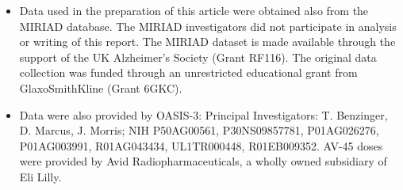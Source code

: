 \begin{itemize}
%
\item Data used in the preparation of this article were obtained also from the MIRIAD database.
The MIRIAD investigators did not participate in analysis or writing of this report.
The MIRIAD dataset is made available through the support of the UK Alzheimer's Society (Grant RF116).
The original data collection was funded through an unrestricted educational grant from GlaxoSmithKline (Grant 6GKC).
%
\item Data were also provided by OASIS-3:
Principal Investigators: T. Benzinger, D. Marcus, J. Morris; NIH P50AG00561, P30NS09857781, P01AG026276, P01AG003991, R01AG043434, UL1TR000448, R01EB009352.
AV-45 doses were provided by Avid Radiopharmaceuticals, a wholly owned subsidiary of Eli Lilly.
%
\end{itemize}

